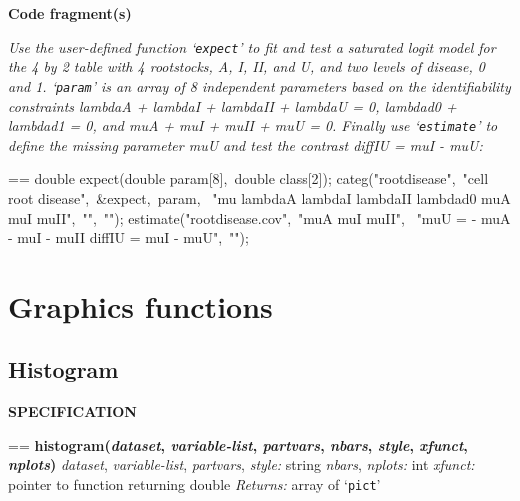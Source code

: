 \documentclass{book}
\makeatletter
\newcommand\Texinfocommandstyletextvar[1]{{\normalfont{}\textsl{#1}}}%
\newenvironment{Texinfopreformatted}{%
  \par\GNUTobeylines\obeyspaces\frenchspacing\parskip=\z@\parindent=\z@}{}
{\catcode`\^^M=13 \gdef\GNUTobeylines{\catcode`\^^M=13 \def^^M{\null\par}}}
\newenvironment{Texinfoindented}{\begin{list}{}{}\item\relax}{\end{list}}
\renewcommand{\_}{\Texinfounderscore\discretionary{}{}{}}
\makeatother
\begin{document}
\noindent{}\textbf{Code fragment(s)}

\emph{Use the user-defined function `\texttt{expect}' to fit and
test a saturated logit model for the 4 by 2 table with 4 rootstocks,
A, I, II, and U, and two levels of disease, 0 and 1.
`\texttt{param}' is an array of 8 independent parameters based on the
identifiability constraints lambda\_A + lambda\_I + lambda\_II + lambda\_U = 0,
lambda\_d0 + lambda\_d1 = 0, and mu\_A + mu\_I + mu\_II + mu\_U = 0.
Finally use `\texttt{estimate}' to define the missing parameter
mu\_U and test the contrast diff\_I\_U = mu\_I - mu\_U:}
\begin{Texinfoindented}
\begin{Texinfopreformatted}%
\ttfamily double expect(double param[8],\ double class[2]);
categ("rootdisease",\ "\_cell\_ root disease",\ \&expect,\ param,
\      "mu lambda\_A lambda\_I lambda\_II lambda\_d0 mu\_A mu\_I mu\_II",\ "",\ "");
estimate("rootdisease.cov",\ "mu\_A mu\_I mu\_II",
\       "mu\_U = - mu\_A - mu\_I - mu\_II diff\_I\_U = mu\_I - mu\_U",\ "");

\end{Texinfopreformatted}
\end{Texinfoindented}


\chapter{{Graphics functions}}
\label{anchor:Graphics-functions}%


\section{{Histogram}}
\label{anchor:Histogram}%

\noindent{}\textbf{SPECIFICATION}
\begin{Texinfoindented}
\begin{Texinfopreformatted}%
\textbf{histogram(\Texinfocommandstyletextvar{dataset}, \Texinfocommandstyletextvar{variable-list}, \Texinfocommandstyletextvar{partvars}, \Texinfocommandstyletextvar{nbars}, \Texinfocommandstyletextvar{style}, \Texinfocommandstyletextvar{xfunct}, \Texinfocommandstyletextvar{nplots})}
\Texinfocommandstyletextvar{dataset}, \Texinfocommandstyletextvar{variable-list}, \Texinfocommandstyletextvar{partvars}, \Texinfocommandstyletextvar{style:} string
\Texinfocommandstyletextvar{nbars}, \Texinfocommandstyletextvar{nplots:} int
\Texinfocommandstyletextvar{xfunct:} pointer to function returning double
\Texinfocommandstyletextvar{Returns:} array of `\texttt{pict}'
\end{Texinfopreformatted}
\end{Texinfoindented}
%
%
\end{document}
